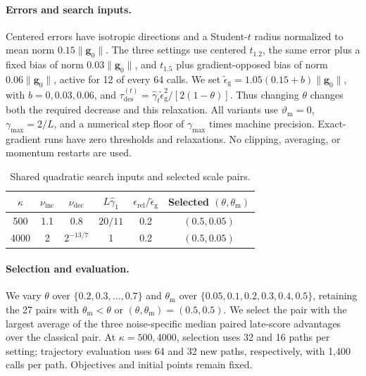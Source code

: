 \documentclass{article}
\begin{document}
\paragraph{Errors and search inputs.}
Centered errors have isotropic directions and a Student-\(t\) radius
normalized to mean norm \(0.15\|\bm g_0\|\).
The three settings use centered \(t_{1.2}\), the same error plus
a fixed bias of norm \(0.03\|\bm g_0\|\), and \(t_{1.5}\) plus
gradient-opposed bias of norm \(0.06\|\bm g_0\|\), active for 12 of
every 64 calls. We set
\(\widetilde\epsilon_{\mathrm g}=1.05(0.15+b)\|\bm g_0\|\),
with \(b=0,0.03,0.06\), and
\(\tau_{\mathrm{des}}^{(t)}
=\hat\gamma_t\widetilde\epsilon_{\mathrm g}^2/[2(1-\theta)]\).
Thus changing \(\theta\) changes both the required decrease and this
relaxation. All variants use \(\vartheta_{\mathrm m}=0\),
\(\gamma_{\max}=2/L\), and a numerical step floor of
\(\gamma_{\max}\) times machine precision. Exact-gradient runs have
zero thresholds and relaxations. No clipping, averaging, or momentum
restarts are used.

\begin{table}[H]
\centering
\caption{Shared quadratic search inputs and selected scale pairs.}
\label{tab:exp_ablation_controls}
\small
\setlength{\tabcolsep}{6pt}
\begin{tabular*}{\linewidth}{@{\extracolsep{\fill}}cccccc@{}}
\toprule
\(\kappa\) & \(\nu_{\mathrm{inc}}\) & \(\nu_{\mathrm{dec}}\) & \(L\hat\gamma_1\)
& \(\epsilon_{\mathrm{rel}}/\widetilde\epsilon_{\mathrm g}\) & Selected \((\theta,\theta_{\mathrm m})\)\\
\midrule
500 & 1.1 & 0.8 & \(20/11\) & 0.2 & \((0.5,0.05)\)\\
4000 & 2 & \(2^{-13/7}\) & 1 & 0.2 & \((0.5,0.05)\)\\
\bottomrule
\end{tabular*}
\end{table}

\paragraph{Selection and evaluation.}
We vary \(\theta\) over \(\{0.2,0.3,\ldots,0.7\}\) and
\(\theta_{\mathrm m}\) over \(\{0.05,0.1,0.2,0.3,0.4,0.5\}\), retaining
the 27 pairs with \(\theta_{\mathrm m}<\theta\) or
\((\theta,\theta_{\mathrm m})=(0.5,0.5)\).
We select the pair with the largest average of the three noise-specific median
paired late-score advantages over the classical pair. At
\(\kappa=500,4000\), selection uses 32 and 16 paths per setting;
trajectory evaluation uses 64 and 32 new paths, respectively, with
1,400 calls per path. Objectives and initial points remain fixed.
\end{document}
